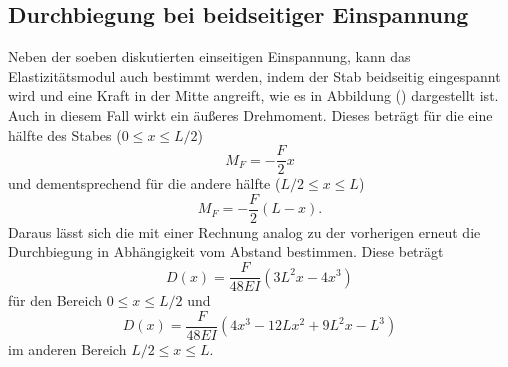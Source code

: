 \subsection{Durchbiegung bei beidseitiger Einspannung}
Neben der soeben diskutierten einseitigen Einspannung, kann das Elastizitätsmodul auch bestimmt werden, indem der Stab beidseitig eingespannt wird und eine Kraft
in der Mitte angreift, wie es in Abbildung () dargestellt ist. Auch in diesem Fall wirkt ein äußeres Drehmoment. Dieses beträgt für die eine hälfte des Stabes ($0\leq x \leq L/2$)
\begin{equation*}
M_F=-\frac{F}{2}x
\end{equation*}
und dementsprechend für die andere hälfte ($L/2\leq x \leq L$)
\begin{equation*}
M_F=-\frac{F}{2}(L-x).
\end{equation*}
Daraus lässt sich die mit einer Rechnung analog zu der vorherigen erneut die Durchbiegung in Abhängigkeit vom Abstand bestimmen. Diese beträgt
\begin{equation}
D(x)=\frac{F}{48EI}(3L^2x-4x^3)
\end{equation}
für den Bereich $0\leq x \leq L/2$ und 
\begin{equation}
D(x)=\frac{F}{48EI}(4x^3-12Lx^2+9L^2x-L^3)
\end{equation}
im anderen Bereich $L/2\leq x \leq L$.
